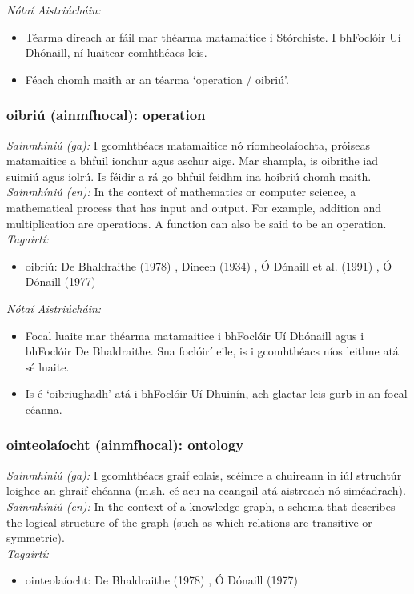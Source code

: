  \noindent \textit{Nótaí Aistriúcháin:}
\begin{itemize}
	\item Téarma díreach ar fáil mar théarma matamaitice i Stórchiste. I bhFoclóir Uí Dhónaill, ní luaitear comhthéacs leis.
	\item Féach chomh maith ar an téarma `operation / oibriú'.
\end{itemize}


\subsubsection*{oibriú (ainmfhocal): operation}
 \noindent \textit{Sainmhíniú (ga):} I gcomhthéacs matamaitice nó ríomheolaíochta, próiseas matamaitice a bhfuil ionchur agus aschur aige. Mar shampla, is oibrithe iad suimiú agus iolrú. Is féidir a rá go bhfuil feidhm ina hoibriú chomh maith.
\\
 \noindent \textit{Sainmhíniú (en):} In the context of mathematics or computer science, a mathematical process that has input and output. For example, addition and multiplication are operations. A function can also be said to be an operation.
\\
 \noindent \textit{Tagairtí:}
\begin{itemize}
	\item oibriú: De Bhaldraithe (1978) \cite{de-bhaldraithe}, Dineen (1934) \cite{dineen}, Ó Dónaill et al. (1991) \cite{focloir-beag}, Ó Dónaill (1977) \cite{odonaill}
\end{itemize}

 \noindent \textit{Nótaí Aistriúcháin:}
\begin{itemize}
	\item Focal luaite mar théarma matamaitice i bhFoclóir Uí Dhónaill agus i bhFoclóir De Bhaldraithe. Sna foclóirí eile, is i gcomhthéacs níos leithne atá sé luaite.
	\item Is é `oibriughadh' atá i bhFoclóir Uí Dhuinín, ach glactar leis gurb in an focal céanna.
\end{itemize}


\subsubsection*{ointeolaíocht (ainmfhocal): ontology}
 \noindent \textit{Sainmhíniú (ga):} I gcomhthéacs graif eolais, scéimre a chuireann in iúl struchtúr loighce an ghraif chéanna (m.sh. cé acu na ceangail atá aistreach nó siméadrach).
\\
 \noindent \textit{Sainmhíniú (en):} In the context of a knowledge graph, a schema that describes the logical structure of the graph (such as which relations are transitive or symmetric).
\\
 \noindent \textit{Tagairtí:}
\begin{itemize}
	\item ointeolaíocht: De Bhaldraithe (1978) \cite{de-bhaldraithe}, Ó Dónaill (1977) \cite{odonaill}
\end{itemize}


